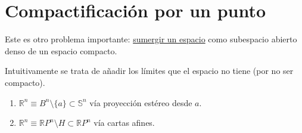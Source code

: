 \section{Compactificación por un punto}%
\label{sec:compactificacion_por_un_punto}
Este es otro problema importante: \underline{sumergir un espacio} como subespacio abierto denso de un espacio compacto.

Intuitivamente se trata de añadir los límites que el espacio no tiene (por no ser compacto).

\begin{ej}
\begin{enumerate}
    \item $\mathbb{R}^n \equiv B^n \setminus \{a\} \subset \mathbb{S}^n$ vía proyección estéreo desde $a$.
    \item $\mathbb{R}^n \equiv \mathbb{R}P^n \setminus H \subset \mathbb{R}P^n$ vía cartas afines.
\end{enumerate}
\end{ej}

